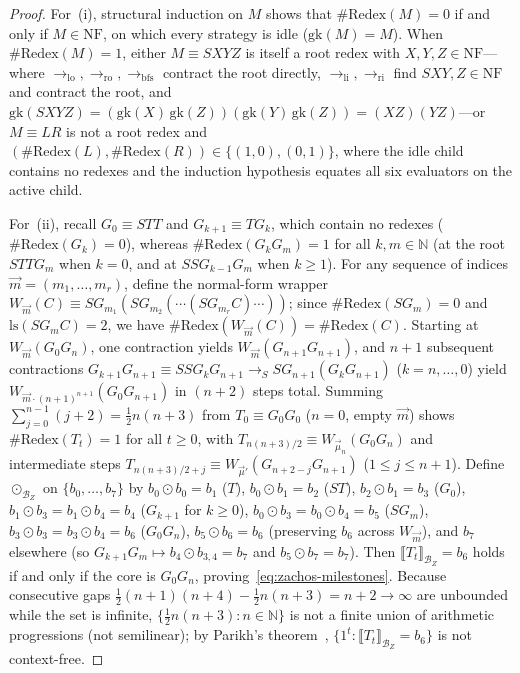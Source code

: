 \documentclass[11pt,reqno]{amsart}
\numberwithin{equation}{section}
\theoremstyle{plain}
\theoremstyle{definition}
\theoremstyle{remark}
\begin{document}
\begin{proof}
For~(i), structural induction on $M$ shows that $\#\mathrm{Redex}(M) = 0$ if and only if $M \in \mathrm{NF}$, on which every strategy is idle ($\mathrm{gk}(M) = M$). When $\#\mathrm{Redex}(M) = 1$, either $M \equiv S X Y Z$ is itself a root redex with $X, Y, Z \in \mathrm{NF}$---where $\to_{\mathrm{lo}}, \to_{\mathrm{ro}}, \to_{\mathrm{bfs}}$ contract the root directly, $\to_{\mathrm{li}}, \to_{\mathrm{ri}}$ find $S X Y, Z \in \mathrm{NF}$ and contract the root, and $\mathrm{gk}(S X Y Z) = (\mathrm{gk}(X)\,\mathrm{gk}(Z))(\mathrm{gk}(Y)\,\mathrm{gk}(Z)) = (X Z)(Y Z)$---or $M \equiv L R$ is not a root redex and $(\#\mathrm{Redex}(L), \#\mathrm{Redex}(R)) \in \{(1, 0), (0, 1)\}$, where the idle child contains no redexes and the induction hypothesis equates all six evaluators on the active child.

For~(ii), recall $G_0 \equiv S T T$ and $G_{k+1} \equiv T G_k$, which contain no redexes ($\#\mathrm{Redex}(G_k) = 0$), whereas $\#\mathrm{Redex}(G_k G_m) = 1$ for all $k, m \in \mathbb{N}$ (at the root $S T T G_m$ when $k = 0$, and at $S S G_{k-1} G_m$ when $k \ge 1$). For any sequence of indices $\vec{m} = (m_1, \dots, m_r)$, define the normal-form wrapper $W_{\vec{m}}(C) \equiv S G_{m_1} (S G_{m_2} (\cdots (S G_{m_r} C)\cdots))$; since $\#\mathrm{Redex}(S G_m) = 0$ and $\mathrm{ls}(S G_m C) = 2$, we have $\#\mathrm{Redex}(W_{\vec{m}}(C)) = \#\mathrm{Redex}(C)$. Starting at $W_{\vec{m}}(G_0 G_n)$, one contraction yields $W_{\vec{m}}(G_{n+1} G_{n+1})$, and $n + 1$ subsequent contractions $G_{k+1} G_{n+1} \equiv S S G_k G_{n+1} \to_S S G_{n+1} (G_k G_{n+1})$ ($k = n, \dots, 0$) yield $W_{\vec{m} \cdot (n+1)^{n+1}}(G_0 G_{n+1})$ in $(n + 2)$ steps total. Summing $\sum_{j=0}^{n-1} (j + 2) = \frac{1}{2}n(n+3)$ from $T_0 \equiv G_0 G_0$ ($n = 0$, empty $\vec{m}$) shows $\#\mathrm{Redex}(T_t) = 1$ for all $t \ge 0$, with $T_{n(n+3)/2} \equiv W_{\vec{\mu}_n}(G_0 G_n)$ and intermediate steps $T_{n(n+3)/2 + j} \equiv W_{\vec{\mu}'}(G_{n+2-j} G_{n+1})$ ($1 \le j \le n + 1$). Define $\odot_{\mathcal{B}_Z}$ on $\{b_0, \dots, b_7\}$ by $b_0 \odot b_0 = b_1$ ($T$), $b_0 \odot b_1 = b_2$ ($S T$), $b_2 \odot b_1 = b_3$ ($G_0$), $b_1 \odot b_3 = b_1 \odot b_4 = b_4$ ($G_{k+1}$ for $k \ge 0$), $b_0 \odot b_3 = b_0 \odot b_4 = b_5$ ($S G_m$), $b_3 \odot b_3 = b_3 \odot b_4 = b_6$ ($G_0 G_n$), $b_5 \odot b_6 = b_6$ (preserving $b_6$ across $W_{\vec{m}}$), and $b_7$ elsewhere (so $G_{k+1} G_m \mapsto b_4 \odot b_{3,4} = b_7$ and $b_5 \odot b_7 = b_7$). Then $\llbracket T_t \rrbracket_{\mathcal{B}_Z} = b_6$ holds if and only if the core is $G_0 G_n$, proving~\eqref{eq:zachos-milestones}. Because consecutive gaps $\frac{1}{2}(n+1)(n+4) - \frac{1}{2}n(n+3) = n + 2 \to \infty$ are unbounded while the set is infinite, $\{ \frac{1}{2}n(n+3) : n \in \mathbb{N} \}$ is not a finite union of arithmetic progressions (not semilinear); by Parikh's theorem~\cite{Parikh1966}, $\{ 1^t : \llbracket T_t \rrbracket_{\mathcal{B}_Z} = b_6 \}$ is not context-free.


\end{proof}
\end{document}
